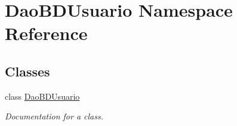 \hypertarget{namespace_dao_b_d_usuario}{}\section{Dao\+B\+D\+Usuario Namespace Reference}
\label{namespace_dao_b_d_usuario}
\subsection*{Classes}
\begin{DoxyCompactItemize}
\item 
class \mbox{\hyperlink{class_dao_b_d_usuario_1_1_dao_b_d_usuario}{Dao\+B\+D\+Usuario}}
\begin{DoxyCompactList}\small\item\em Documentation for a class. \end{DoxyCompactList}\end{DoxyCompactItemize}
